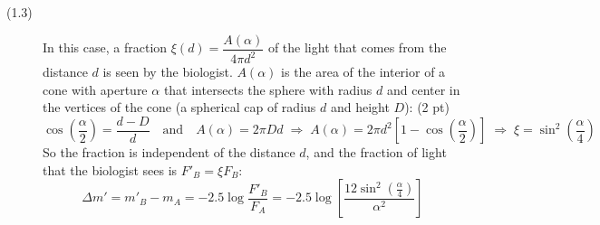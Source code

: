 \begin{description}
\item[(1.3)] In this case, a fraction
$\xi(d) = \dfrac{A(\alpha)}{4\pi d^2}$ of the light that comes from the
distance $d$ is seen by the biologist. $A(\alpha)$ is the area of the
interior of a cone with aperture $\alpha$ that intersects the sphere with
radius $d$ and center in the vertices of the cone (a spherical cap of radius
$d$ and height $D$): \hfill(2 pt)
\[
\cos\left(\frac{\alpha}{2}\right) = \frac{d - D}{d}
\quad\text{and}\quad
A(\alpha) = 2\pi D d
\;\Rightarrow\;
A(\alpha) = 2\pi d^2 \left[ 1 - \cos\left(\frac{\alpha}{2}\right) \right]
\;\Rightarrow\;
\xi = \sin^2\left(\frac{\alpha}{4}\right) \tag*{(4 pt)}
\]
So the fraction is independent of the distance $d$, and the fraction of light
that the biologist sees is $F'_B = \xi F_B$:
\[
\Delta m' = m'_B - m_A = -2.5 \log\frac{F'_B}{F_A}
  = -2.5 \log\!\left[ \frac{12 \sin^2\left(\frac{\alpha}{4}\right)}{\alpha^2} \right]
\tag*{(3 pt)}
\]
\end{description}
